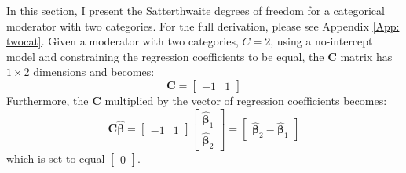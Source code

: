 In this section, I present the Satterthwaite degrees of freedom for a categorical moderator with two categories. For the full derivation, please see Appendix \ref{App: twocat}. Given a moderator with two categories, $C=2$, using a no-intercept model and constraining the regression coefficients to be equal, the $\mathbf{C}$ matrix has $1 \times 2$ dimensions and becomes:
 \begin{equation}
     \mathbf{C} = 
     \begin{bmatrix} 
     -1 & 1 
     \end{bmatrix}
     \nonumber
 \end{equation}
Furthermore, the $\mathbf{C}$ multiplied by the vector of regression coefficients becomes:
 \begin{equation}
     \mathbf{C} \bm{\hat{\beta}}= 
     \begin{bmatrix} 
     -1 & 1 \end{bmatrix}\begin{bmatrix}\bm{\hat{\beta}}_1 \\
     \bm{\hat{\beta}}_2 \end{bmatrix}  = \begin{bmatrix}
         \bm{\hat{\beta}}_2 - \bm{\hat{\beta} }_1
     \end{bmatrix}
     \nonumber
 \end{equation}
 which is set to equal $\begin{bmatrix}
     0 
 \end{bmatrix}$. 

